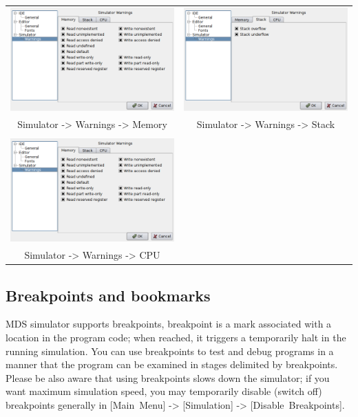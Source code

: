         \begin{table}[h!]
            \begin{tabular}{cc}
                \includegraphics[width=.45\textwidth]{img/interface4.png}
                    &
                \includegraphics[width=.45\textwidth]{img/interface5.png}
                \\ Simulator -> Warnings -> Memory & Simulator -> Warnings -> Stack
                \\
                \\ \includegraphics[width=.5\textwidth]{img/interface4.png}
                \\ Simulator -> Warnings -> CPU
            \end{tabular}
        \end{table}

    \subsection{Breakpoints and bookmarks}
        MDS simulator supports breakpoints, breakpoint is a mark associated with a location in the program code; when
        reached, it triggers a temporarily halt in the running simulation. You can use breakpoints to test and debug
        programs in a manner that the program can be examined in stages delimited by breakpoints. Please be also aware
        that using breakpoints slows down the simulator; if you want maximum simulation speed, you may temporarily
        disable (switch off) breakpoints generally in [Main~Menu] -> [Simulation] -> [Disable~Breakpoints].

